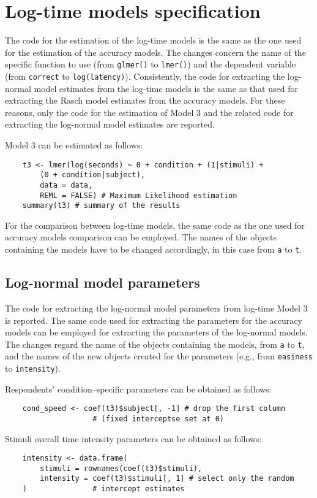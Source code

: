 \documentclass[12pt]{book}
\begin{document}
\section{Log-time models specification}

The code for the estimation of the log-time models is the same as the one used for the estimation of the accuracy models. The changes concern the name of the specific function to use (from \texttt{glmer()} to \texttt{lmer()}) and the dependent variable (from \texttt{correct} to \texttt{log(latency)}). 
Consistently, the code for extracting the log-normal model estimates from the log-time models is the same as that used for extracting the Rasch model estimates from the accuracy models.
For these reasons, only the code for the estimation of Model 3 and the related code for extracting the log-normal model estimates are reported.

Model 3 can be estimated as follows: 
%
\begin{lstlisting}
	t3 <- lmer(log(seconds) ~ 0 + condition + (1|stimuli) + 
		(0 + condition|subject),
		data = data,
		REML = FALSE) # Maximum Likelihood estimation
	summary(t3) # summary of the results
\end{lstlisting}
%
For the comparison between log-time models, the same code as the one used for accuracy models comparison can be employed. 
The names of the objects containing the models have to be changed accordingly, in this case from \texttt{a} to \texttt{t}.

\subsection{Log-normal model parameters}
	
The code for extracting the log-normal model parameters from log-time Model 3 is reported. 
The same code used for extracting the parameters for the accuracy models can be employed for extracting the parameters of the log-normal models. 
The changes regard the name of the objects containing the models, from \texttt{a} to \texttt{t}, and the names of the new objects created for the parameters (e.g., from \texttt{easiness} to \texttt{intensity}).

Respondents' condition--specific parameters can be obtained as follows: 
%
\begin{lstlisting}
	cond_speed <- coef(t3)$subject[, -1] # drop the first column 
					# (fixed interceptse set at 0)
\end{lstlisting}

Stimuli overall time intensity parameters can be obtained as follows: 
%
\begin{lstlisting}
	intensity <- data.frame(
		stimuli = rownames(coef(t3)$stimuli),
		intensity = coef(t3)$stimuli[, 1] # select only the random
	)				# intercept estimates
\end{lstlisting}	


\newpage
% 
%
\end{document}

